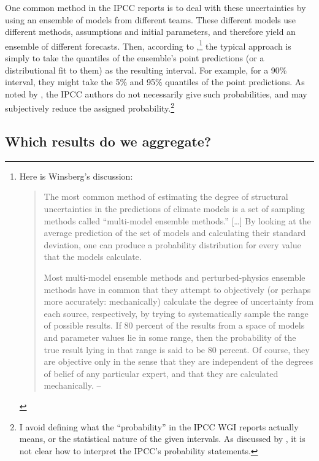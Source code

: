 \documentclass[letterpaper,12pt]{article}
\begin{document}
One common method in the IPCC reports is to deal with these uncertainties by using an ensemble of models from different teams. These different models use different methods, assumptions and initial parameters, and therefore yield an ensemble of different forecasts. Then, according to \citet[pg. 96]{winsberg2018philosophy},\footnote{Here is Winsberg's discussion: \begin{quote}
  The most common method of estimating the degree of structural uncertainties in the predictions of climate models is a set of sampling methods called ``multi-model ensemble methods.'' [\ldots] By looking at the average prediction of the set of models and calculating their standard deviation, one can produce a probability distribution for every value that the models calculate.
  
  Most multi-model ensemble methods and perturbed-physics ensemble methods have in common that they attempt to objectively (or perhaps more accurately: mechanically) calculate the degree of uncertainty from each source, respectively, by trying to systematically sample the range of possible results. If 80 percent of the results from a space of models and parameter values lie in some range, then the probability of the true result lying in that range is said to be 80 percent. Of course, they are objective only in the sense that they are independent of the degrees of belief of any particular expert, and that they are calculated mechanically.
  \hfill -- \citet[pg. 96]{winsberg2018philosophy}
\end{quote}} the typical approach is simply to take the quantiles of the ensemble's point predictions (or a distributional fit to them) as the resulting interval. For example, for a 90\% interval, they might take the 5\% and 95\% quantiles of the point predictions. As noted by \citet[Section 2.5.2, pg. 63]{harris2021conceptualizing}, the IPCC authors do not necessarily give such probabilities, and may subjectively reduce the assigned probability.\footnote{I avoid defining what the ``probability'' in the IPCC WGI reports actually means, or the statistical nature of the given intervals. As discussed by \citet[Section 1.4]{harris2021conceptualizing}, it is not clear how to interpret the IPCC's probability statements.}






\subsection{Which results do we aggregate?}
\end{document}
